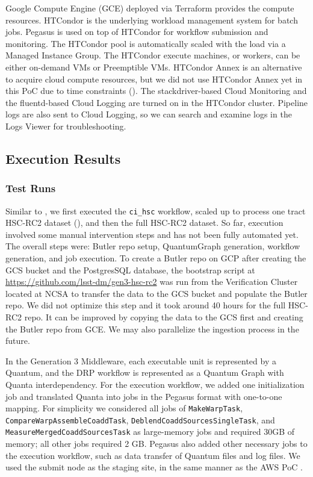Google Compute Engine (GCE) deployed via Terraform provides the compute resources.
HTCondor is the underlying workload management system for batch jobs.
Pegasus is used on top of HTCondor for workflow submission and monitoring.
The HTCondor pool is automatically scaled with the load via a Managed Instance Group.
The HTCondor execute machines, or workers, can be either on-demand VMs or Preemptible VMs.
HTCondor Annex is an alternative to acquire cloud compute resources, but we did not use HTCondor Annex yet in this PoC due to time constraints ().
The stackdriver-based Cloud Monitoring and the fluentd-based Cloud Logging are turned on in the HTCondor cluster.
Pipeline logs are also sent to Cloud Logging, so we can search and examine logs in the Logs Viewer for troubleshooting.


\subsection{Execution Results}

\subsubsection{Test Runs}

Similar to , we first executed the \texttt{ci\_hsc} workflow, scaled up to process one tract HSC-RC2 dataset (), and then the full HSC-RC2 dataset.
So far, execution involved some manual intervention steps and has not been fully automated yet.
The overall steps were: Butler repo setup, QuantumGraph generation, workflow generation, and job execution.
To create a Butler repo on GCP after creating the GCS bucket and the PostgresSQL database, the bootstrap script at \url{https://github.com/lsst-dm/gen3-hsc-rc2} was run from the Verification Cluster located at NCSA to transfer the data to the GCS bucket and populate the Butler repo.
We did not optimize this step and it took around 40 hours for the full HSC-RC2 repo.
It can be improved by copying the data to the GCS first and creating the Butler repo from GCE.
We may also parallelize the ingestion process in the future.

In the Generation 3 Middleware, each executable unit is represented by a Quantum, and the DRP workflow is represented as a Quantum Graph with Quanta interdependency.
For the execution workflow, we added one initialization job and translated Quanta into jobs in the Pegasus format with one-to-one mapping.
For simplicity we considered all jobs of \texttt{MakeWarpTask}, \texttt{CompareWarpAssembleCoaddTask}, \texttt{DeblendCoaddSourcesSingleTask}, and \texttt{MeasureMergedCoaddSourcesTask} as large-memory jobs and required 30GB of memory; all other jobs required 2 GB.
Pegasus also added other necessary jobs to the execution workflow, such as data transfer of Quantum files and log files.
We used the submit node as the staging site, in the same manner as the AWS PoC .

